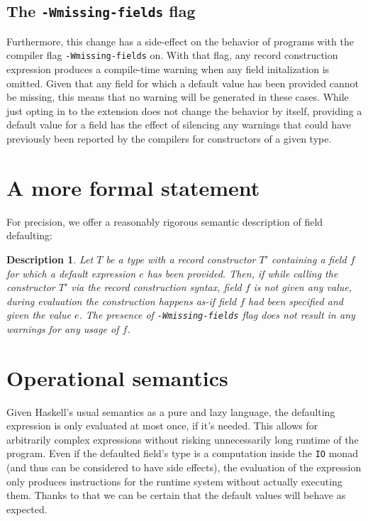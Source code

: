 \documentclass[en]{pracamgr}
\newcommand{\code}[1]{\lstinline[breaklines=true]{#1}}
\begin{document}
\subsection{The \code{-Wmissing-fields} flag}
Furthermore, this change has a side-effect on the behavior of programs with the compiler flag \code{-Wmissing-fields} on.
With that flag, any record construction expression produces a compile-time warning when any field initalization is omitted.
Given that any field for which a default value has been provided cannot be missing, this means that no warning will be 
generated in these cases.
While just opting in to the extension does not change the behavior by itself, providing a default value for a field
has the effect of silencing any warnings that could have previously been reported by the compilers for constructors 
of a given type.

\section{A more formal statement}
For precision, we offer a reasonably rigorous semantic description of field defaulting:
\newtheorem{remark}{Description}
\begin{remark}
  \normalfont
  Let $T$ be a type with a record constructor $T'$ containing a field $f$ for which a default expression $e$ has been provided.
  Then, if while calling the constructor $T'$ via the record construction syntax, field $f$ is not given any value, 
  during evaluation the construction happens \textit{as-if} field $f$ had been specified and given the value $e$.
  The presence of \code{-Wmissing-fields} flag does not result in any warnings for any usage of $f$.
\end{remark}

\section{Operational semantics}
Given Haskell's usual semantics as a pure and lazy language, the defaulting expression is only evaluated at most once, if it's needed.
This allows for arbitrarily complex expressions without risking unnecessarily long runtime of the program. 
Even if the defaulted field's type is a computation inside the \code{IO} monad (and thus can be considered to have side effects), the evaluation of the expression only produces instructions for the runtime system without actually executing them.
Thanks to that we can be certain that the default values will behave as expected.
\end{document}
